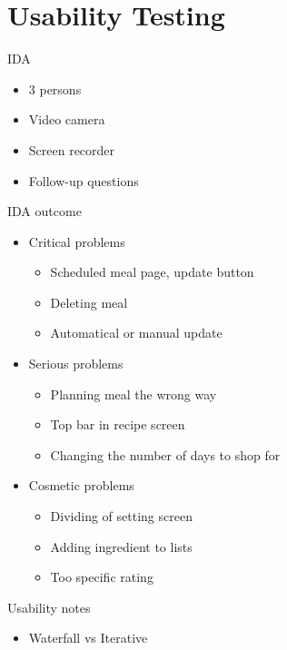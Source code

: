 \section{Usability Testing} 
\begin{frame}{IDA}
	\begin{itemize}
		\item 3 persons
		\item Video camera
		\item Screen recorder
		\item Follow-up questions
	\end{itemize}
\end{frame}

\begin{frame}{IDA outcome}
    \begin{itemize}
	\item Critical problems
		\begin{itemize}
			\item Scheduled meal page, update button
			\item Deleting meal
			\item Automatical or manual update
		\end{itemize}
	\item Serious problems
		\begin{itemize}
			\item Planning meal the wrong way
			\item Top bar in recipe screen
			\item Changing the number of days to shop for 
		\end{itemize}
	\item Cosmetic problems
		\begin{itemize}
			\item Dividing of setting screen
			\item Adding ingredient to lists
			\item Too specific rating
		\end{itemize}
    \end{itemize}
\end{frame}

\begin{frame}{Usability notes}
	\begin{itemize}
		\item Waterfall vs Iterative
	\end{itemize}
\end{frame}
